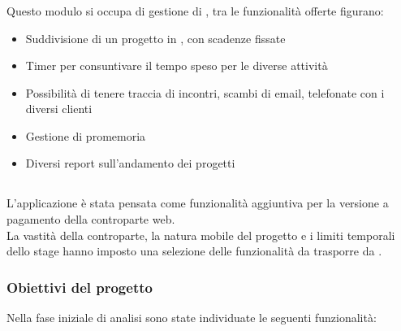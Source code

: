 \subsubsection{\resa}
Questo modulo si occupa di gestione di , tra le funzionalità offerte
figurano:

\begin{itemize}
\item Suddivisione di un progetto in , con scadenze fissate
\item Timer per consuntivare il tempo speso per le diverse attività
\item Possibilità di tenere traccia di incontri, scambi di email, telefonate
con i diversi clienti
\item Gestione di promemoria
\item Diversi report sull'andamento dei progetti
\end{itemize}

\subsection{\fiscoloMobile}
L'applicazione è stata pensata come funzionalità aggiuntiva per la versione
a pagamento della controparte web. \\
La vastità della controparte, la natura mobile del progetto e i limiti temporali
dello stage hanno imposto una selezione delle funzionalità da trasporre da
\fiscoloWeb{}.

\subsubsection{Obiettivi del progetto}\label{obiettivi}
Nella fase iniziale di analisi sono state individuate le seguenti funzionalità:

